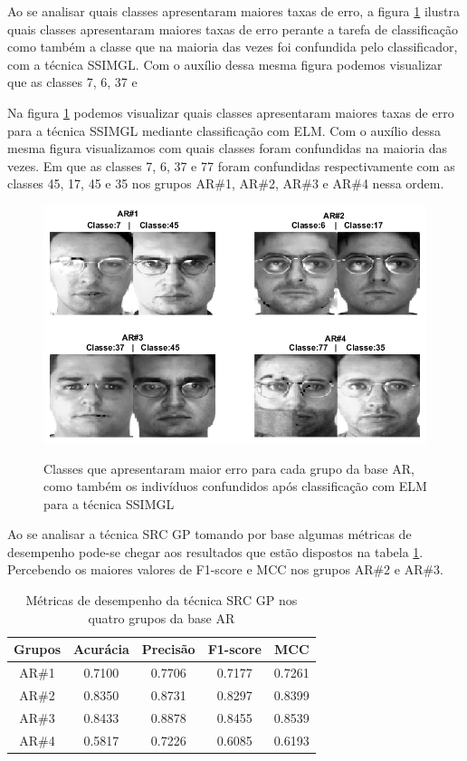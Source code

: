 Ao se analisar quais classes apresentaram maiores taxas de erro, a figura \ref{fig:classes_erradas_ssimgl} ilustra quais classes apresentaram maiores taxas de erro perante a tarefa de classificação como também a classe que na maioria das vezes foi confundida pelo classificador, com a técnica SSIMGL. Com o auxílio dessa mesma figura podemos visualizar que as classes 7, 6, 37 e 

Na figura \ref{fig:classes_erradas_ssimgl} podemos visualizar quais classes apresentaram maiores taxas de erro para a técnica SSIMGL mediante classificação com ELM. Com o auxílio dessa mesma figura visualizamos com quais classes foram confundidas na maioria das vezes. Em que as classes 7, 6, 37 e 77 foram confundidas respectivamente com as classes 45, 17, 45 e 35 nos grupos AR\#1, AR\#2, AR\#3 e AR\#4 nessa ordem.


\begin{figure}[H]
\centering
\caption{Classes que apresentaram maior erro para cada grupo da base AR, como também os indivíduos confundidos após classificação com ELM para a técnica SSIMGL}
\includegraphics[scale=0.6]{imgs4/classes_erradas_ssimgl}
\label{fig:classes_erradas_ssimgl}
\end{figure}


Ao se analisar a técnica SRC GP tomando por base algumas métricas de desempenho pode-se chegar aos resultados que estão dispostos na tabela \ref{tab:metricas_src_gp}. Percebendo os maiores valores de F1-score e MCC nos grupos AR\#2 e AR\#3.


\begin{table}[htpb]
    \centering
	\caption{Métricas de desempenho da técnica SRC GP nos quatro grupos da base AR}
\begin{tabular}{|c|c|c|c|c|}
\hline
\textbf{Grupos} & \textbf{Acurácia} & \textbf{Precisão} & \textbf{F1-score} & \textbf{MCC} \\\hline
AR\#1	&0.7100&	0.7706&	0.7177&	0.7261\\\hline
AR\#2	&0.8350&	0.8731&	0.8297&	0.8399\\\hline
AR\#3	&0.8433&	0.8878&	0.8455&	0.8539\\\hline
AR\#4	&0.5817&	0.7226&	0.6085&	0.6193\\\hline
\end{tabular}
\label{tab:metricas_src_gp}
\end{table}


